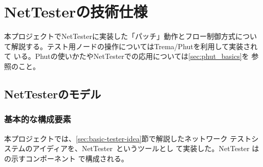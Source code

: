 
\chapter{NetTesterの技術仕様}
\label{chap:nettester-design}

本プロジェクトでNetTesterに実装した「パッチ」動作とフロー制御方式につい
て解説する。テスト用ノードの操作についてはTrema/Phutを利用して実装されて
いる。Phutの使いかたやNetTesterでの応用については\ref{sec:phut_basics}を
参照のこと。

 \section{NetTesterのモデル}
 \label{sec:nettester-model}

 \subsection{基本的な構成要素}
 \label{sec:nettester-model}


本プロジェクトでは、\ref{sec:basic-tester-idea}節で解説したネットワーク
テストシステムのアイディアを、NetTester~\cite{nettester}というツールとし
て実装した。NetTester はの示すコンポーネント
で構成される。

